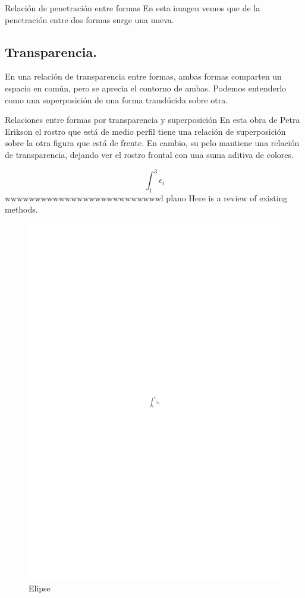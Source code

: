 \documentclass[
  16pt,
]{krantz}
\theoremstyle{definition}
\theoremstyle{definition}
\theoremstyle{definition}
\theoremstyle{definition}
\theoremstyle{remark}
\begin{document}
Relación de penetración entre formas
En esta imagen vemos que de la penetración entre dos formas surge una nueva.

\hypertarget{transparencia.}{%
\subsection{Transparencia.}\label{transparencia.}}

En una relación de transparencia entre formas, ambas formas comparten un espacio en común, pero se aprecia el contorno de ambas. Podemos entenderlo como una superposición de una forma translúcida sobre otra.

Relaciones entre formas por transparencia y superposición
En esta obra de Petra Erikson el rostro que está de medio perfil tiene una relación de superposición sobre la otra figura que está de frente. En cambio, su pelo mantiene una relación de transparencia, dejando ver el rostro frontal con una suma aditiva de colores.

\[\int_1^3\epsilon_i\]
wwwwwwwwwwwwwwwwwwwwwwwwwwl plano Here is a review of existing methods.

\begin{figure}[!ht]

{\centering \includegraphics{dibujo} 

}

\caption{Elipse}\label{fig:pressure1}
\end{figure}
\end{document}
